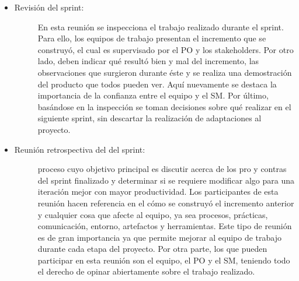 \begin{itemize}
    \item   \begin{description}
                \item[Revisión del sprint: ] En esta reunión se inspecciona el trabajo realizado durante el sprint. Para ello, los equipos de trabajo presentan el incremento que se construyó, el cual es supervisado por el PO y los stakeholders. Por otro lado, deben indicar qué resultó bien y mal del incremento, las observaciones que surgieron durante éste y se realiza una demostración del producto que todos pueden ver. Aquí nuevamente se destaca la importancia de la confianza entre el equipo y el SM. Por último, basándose en la inspección se toman decisiones sobre qué realizar en el siguiente sprint, sin descartar la realización de adaptaciones al proyecto. 
        
            \end{description}

    \item   \begin{description}
                \item[Reunión retrospectiva del del sprint: ] proceso cuyo objetivo principal es discutir acerca de los pro y contras del sprint finalizado y determinar si se requiere modificar algo para una iteración mejor con mayor productividad. Los participantes de esta reunión hacen referencia en el cómo se construyó el incremento anterior y cualquier cosa que afecte al equipo, ya sea procesos, prácticas, comunicación, entorno, artefactos y herramientas. Este tipo de reunión es de gran importancia ya que permite mejorar al equipo de trabajo durante cada etapa del proyecto. Por otra parte, los que pueden participar en esta reunión son el equipo, el PO y el SM, teniendo todo el derecho de opinar abiertamente sobre el trabajo realizado.

            \end{description}
\end{itemize}
